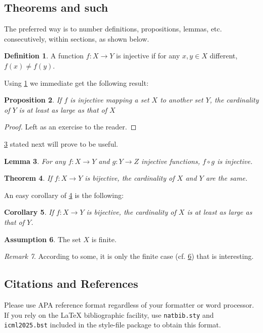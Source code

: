 \documentclass{article}
\theoremstyle{plain}
\newtheorem{theorem}{Theorem}[section]
\newtheorem{proposition}[theorem]{Proposition}
\newtheorem{lemma}[theorem]{Lemma}
\newtheorem{corollary}[theorem]{Corollary}
\theoremstyle{definition}
\newtheorem{definition}[theorem]{Definition}
\newtheorem{assumption}[theorem]{Assumption}
\theoremstyle{remark}
\newtheorem{remark}[theorem]{Remark}
\begin{document}
\subsection{Theorems and such}
The preferred way is to number definitions, propositions, lemmas, etc. consecutively, within sections, as shown below.
\begin{definition}
\label{def:inj}
A function $f:X \to Y$ is injective if for any $x,y\in X$ different, $f(x)\ne f(y)$.
\end{definition}
Using \cref{def:inj} we immediate get the following result:
\begin{proposition}
If $f$ is injective mapping a set $X$ to another set $Y$, 
the cardinality of $Y$ is at least as large as that of $X$
\end{proposition}
\begin{proof} 
Left as an exercise to the reader. 
\end{proof}
\cref{lem:usefullemma} stated next will prove to be useful.
\begin{lemma}
\label{lem:usefullemma}
For any $f:X \to Y$ and $g:Y\to Z$ injective functions, $f \circ g$ is injective.
\end{lemma}
\begin{theorem}
\label{thm:bigtheorem}
If $f:X\to Y$ is bijective, the cardinality of $X$ and $Y$ are the same.
\end{theorem}
An easy corollary of \cref{thm:bigtheorem} is the following:
\begin{corollary}
If $f:X\to Y$ is bijective, 
the cardinality of $X$ is at least as large as that of $Y$.
\end{corollary}
\begin{assumption}
The set $X$ is finite.
\label{ass:xfinite}
\end{assumption}
\begin{remark}
According to some, it is only the finite case (cf. \cref{ass:xfinite}) that is interesting.
\end{remark}

\subsection{Citations and References}

Please use APA reference format regardless of your formatter
or word processor. If you rely on the \LaTeX\/ bibliographic
facility, use \texttt{natbib.sty} and \texttt{icml2025.bst}
included in the style-file package to obtain this format.
\end{document}
